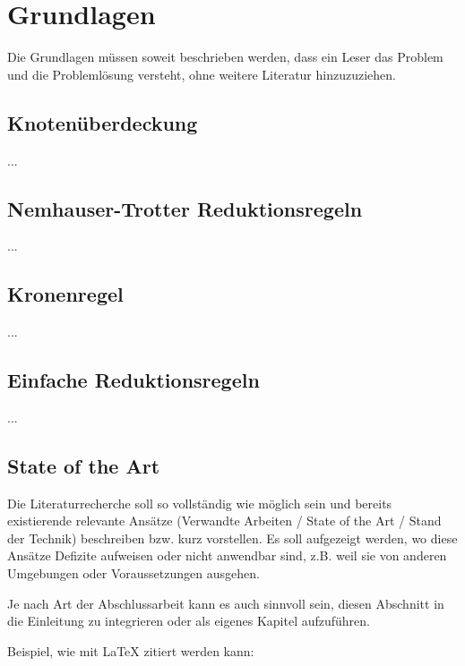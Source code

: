 
\chapter{Grundlagen}
\label{ch:Grundlagen}
Die Grundlagen müssen soweit beschrieben
werden, dass ein Leser das Problem und
die Problemlösung versteht, ohne weitere Literatur hinzuzuziehen.


\section{Knotenüberdeckung}
\label{ch:Grundlagen:sec:Knotenüberdeckung}

...

\section{Nemhauser-Trotter Reduktionsregeln}
\label{ch:Grundlagen:sec:Nemhauser-Trotter Reduktionsregeln}

...

\section{Kronenregel}
\label{ch:Grundlagen:sec:Kronenregel}

...

\section{Einfache Reduktionsregeln}
\label{ch:Grundlagen:sec:Einfache Reduktionsregeln}

...


\section{State of the Art}
\label{ch:Grundlagen:sec:SOTA}
Die Literaturrecherche soll so vollständig wie möglich sein und bereits existierende relevante Ansätze (Verwandte Arbeiten / State of the Art / Stand der Technik) beschreiben bzw. kurz vorstellen.
Es soll aufgezeigt werden, wo diese Ansätze Defizite aufweisen oder nicht anwendbar sind, z.B. weil sie von anderen Umgebungen oder Voraussetzungen ausgehen.

Je nach Art der Abschlussarbeit kann es auch sinnvoll sein, diesen Abschnitt in die Einleitung zu integrieren oder als eigenes Kapitel aufzuführen.

Beispiel, wie mit LaTeX zitiert werden kann: \cite{TB98,JSAC96,qosr}

